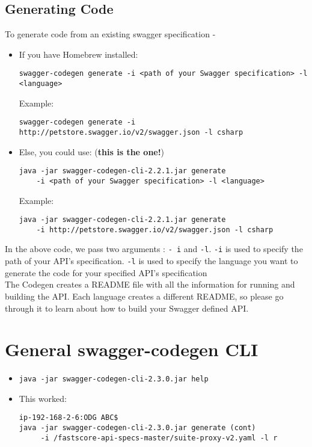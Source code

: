 \documentclass{article}
\begin{document}
\subsection*{Generating Code}

To generate code from an existing swagger specification -
\begin{itemize}
\item If you have Homebrew installed:
\begin{verbatim}
swagger-codegen generate -i <path of your Swagger specification> -l <language>
\end{verbatim}
Example:
\begin{verbatim}
swagger-codegen generate -i http://petstore.swagger.io/v2/swagger.json -l csharp
\end{verbatim}
\item Else, you could use: ({\bf this is the one!})
\begin{verbatim}
java -jar swagger-codegen-cli-2.2.1.jar generate 
    -i <path of your Swagger specification> -l <language> 
\end{verbatim}
Example:
\begin{verbatim}
java -jar swagger-codegen-cli-2.2.1.jar generate 
    -i http://petstore.swagger.io/v2/swagger.json -l csharp
\end{verbatim}
\end{itemize}
In the above code, we pass two arguments : \verb|- i| and \verb|-l|. \verb|-i| is used to specify the path of your API’s specification. \verb|-l| is used to specify the language you want to generate the code for your specified API’s specification \\

The Codegen creates a README file with all the information for running and building the API. Each language creates a different README, so please go through it to learn about how to build your Swagger defined API.

\section*{General swagger-codegen CLI}
\begin{itemize}
\item \verb|java -jar swagger-codegen-cli-2.3.0.jar help|
\item This worked: 
\begin{verbatim}ip-192-168-2-6:ODG ABC$
java -jar swagger-codegen-cli-2.3.0.jar generate (cont)
     -i /fastscore-api-specs-master/suite-proxy-v2.yaml -l r
\end{verbatim}
\end{itemize}
\end{document}
